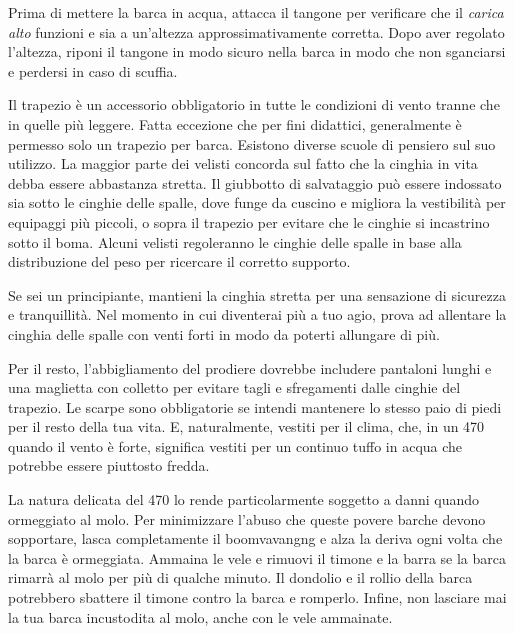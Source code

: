 Prima di mettere la barca in acqua, attacca il tangone per verificare che il
\emph{carica alto} funzioni e sia a un'altezza approssimativamente corretta.
Dopo aver regolato l'altezza, riponi il tangone in modo sicuro nella barca in
modo che non sganciarsi e perdersi in caso di scuffia.

Il trapezio è un accessorio obbligatorio in tutte le condizioni di vento tranne
che in quelle più leggere. Fatta eccezione che per fini didattici, generalmente è
permesso solo un trapezio per barca. Esistono diverse scuole di pensiero sul suo
utilizzo. La maggior parte dei velisti concorda sul fatto che la cinghia in vita
debba essere abbastanza stretta. Il giubbotto di salvataggio può essere
indossato sia sotto le cinghie delle spalle, dove funge da cuscino e migliora la
vestibilità per equipaggi più piccoli, o sopra il trapezio per evitare che le
cinghie si incastrino sotto il boma. Alcuni velisti regoleranno le cinghie delle
spalle in base alla distribuzione del peso per ricercare il corretto supporto.

Se sei un principiante, mantieni la cinghia stretta per una sensazione di
sicurezza e tranquillità. Nel momento in cui diventerai più a tuo agio, prova ad
allentare la cinghia delle spalle con venti forti in modo da poterti allungare
di più.

Per il resto, l'abbigliamento del prodiere dovrebbe includere pantaloni lunghi e
una maglietta con colletto per evitare tagli e sfregamenti dalle cinghie del
trapezio. Le scarpe sono obbligatorie se intendi mantenere lo stesso paio di piedi
per il resto della tua vita. E, naturalmente, vestiti per il clima, che, in un
470 quando il vento è forte, significa vestiti per un continuo tuffo in acqua
che potrebbe essere piuttosto fredda.

La natura delicata del 470 lo rende particolarmente soggetto a danni quando
ormeggiato al molo.
Per minimizzare l'abuso che queste povere barche devono sopportare, lasca
completamente il
boomvavangng e alza la deriva ogni volta che la barca è ormeggiata. Ammaina le vele
e rimuovi il timone e la barra se la barca rimarrà al molo per più di qualche
minuto. Il dondolio e il rollio della barca potrebbero sbattere il timone contro
la barca e romperlo. Infine, non lasciare mai la tua barca
incustodita al molo, anche con le vele ammainate.



